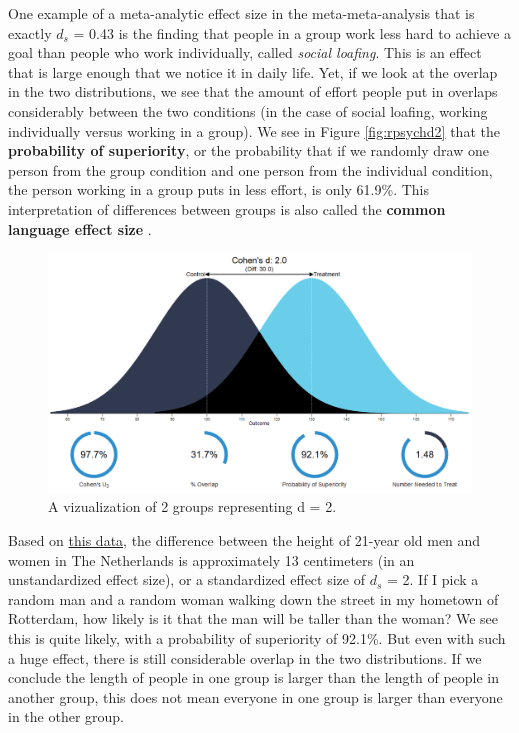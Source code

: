 \documentclass[
  oneside]{book}
\begin{document}
One example of a meta-analytic effect size in the meta-meta-analysis that is exactly \(d_s\) = 0.43 is the finding that people in a group work less hard to achieve a goal than people who work individually, called \emph{social loafing}. This is an effect that is large enough that we notice it in daily life. Yet, if we look at the overlap in the two distributions, we see that the amount of effort people put in overlaps considerably between the two conditions (in the case of social loafing, working individually versus working in a group). We see in Figure \ref{fig:rpsychd2} that the \textbf{probability of superiority}, or the probability that if we randomly draw one person from the group condition and one person from the individual condition, the person working in a group puts in less effort, is only 61.9\%. This interpretation of differences between groups is also called the \textbf{common language effect size} \citep{mcgraw_common_1992}.

\begin{figure}

{\centering \includegraphics[width=1\linewidth]{images/rpsychd3} 

}

\caption{A vizualization of 2 groups representing d = 2.}\label{fig:rpsychd3}
\end{figure}

Based on \href{http://www.nature.com/pr/journal/v73/n3/full/pr2012189a.html}{this data}, the difference between the height of 21-year old men and women in The Netherlands is approximately 13 centimeters (in an unstandardized effect size), or a standardized effect size of \(d_s\) = 2. If I pick a random man and a random woman walking down the street in my hometown of Rotterdam, how likely is it that the man will be taller than the woman? We see this is quite likely, with a probability of superiority of 92.1\%. But even with such a huge effect, there is still considerable overlap in the two distributions. If we conclude the length of people in one group is larger than the length of people in another group, this does not mean everyone in one group is larger than everyone in the other group.
\end{document}

